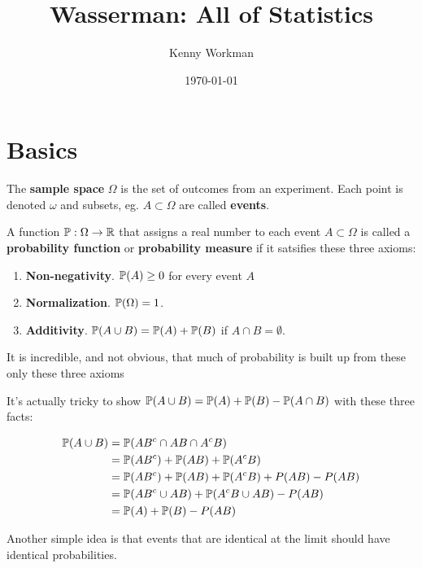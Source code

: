 \documentclass[10pt]{article}
\title{Wasserman: All of Statistics}
\author{Kenny Workman}
\date{\today}
\begin{document}
\maketitle

\section{Basics}

\begin{definition}
    The \textbf{sample space} $\Omega$ is the set of outcomes from an experiment. Each
    point is denoted $\omega$ and subsets, eg. $A \subset \Omega$ are called
    \textbf{events}.
\end{definition}

\begin{definition}
    A function $\P: \Omega \to \R$ that assigns a real number to each event $A
    \subset \Omega$ is called a \textbf{probability function} or
    \textbf{probability measure} if it satsifies these three axioms:
    \begin{enumerate}
        \item \textbf{Non-negativity}. $\P(A) \ge 0$ for every event $A$
        \item \textbf{Normalization}. $\P(\Omega) = 1$.
        \item \textbf{Additivity}. $\P(A\cup B) = \P(A) + \P(B)$ if $A \cap B = \emptyset$.
    \end{enumerate}
\end{definition}

It is incredible, and not obvious, that much of probability is built up from
these only these three axioms

\begin{example}

It's actually tricky to show $\P(A \cup B) = \P(A) + \P(B) - \P(A \cap B)$ with
these three facts:

\begin{align*}
\P(A \cup B) &= \P(AB^c \cap AB \cap A^cB) \\
&= \P(AB^c) + \P(AB) + \P(A^cB) \\
&= \P(AB^c) + \P(AB) + \P(A^cB) + P(AB) - P(AB) \\
&= \P(AB^c \cup AB) + \P(A^cB \cup AB) - P(AB) \\
&= \P(A) + \P(B) - P(AB)
\end{align*}
\end{example}

Another simple idea is that events that are identical at the limit should have
identical probabilities.
\end{document}
